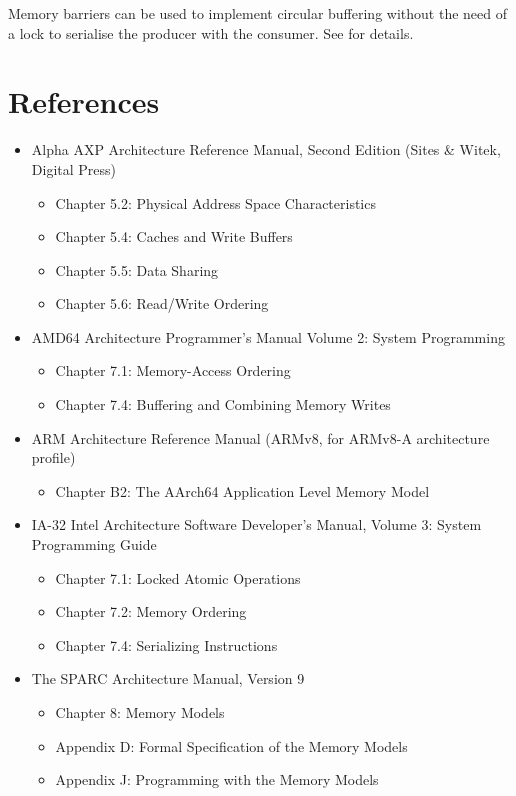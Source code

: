 Memory barriers can be used to implement circular buffering without the need
of a lock to serialise the producer with the consumer.
See  for details.


\section{References}

\begingroup
\footnotesize
\begin{itemize}
\item
Alpha AXP Architecture Reference Manual, Second Edition (Sites \& Witek,
Digital Press)
  \begin{itemize}
    \item
	Chapter 5.2: Physical Address Space Characteristics
    \item
	Chapter 5.4: Caches and Write Buffers
    \item
	Chapter 5.5: Data Sharing
    \item
	Chapter 5.6: Read/Write Ordering
  \end{itemize}

\item
AMD64 Architecture Programmer's Manual Volume 2: System Programming
  \begin{itemize}
    \item
	Chapter 7.1: Memory-Access Ordering
    \item
	Chapter 7.4: Buffering and Combining Memory Writes
  \end{itemize}
       
\item
ARM Architecture Reference Manual (ARMv8, for ARMv8-A architecture profile)
  \begin{itemize}
    \item
	Chapter B2: The AArch64 Application Level Memory Model
  \end{itemize}

\item
IA-32 Intel Architecture Software Developer's Manual, Volume 3:
System Programming Guide
  \begin{itemize}
    \item
	Chapter 7.1: Locked Atomic Operations
    \item
	Chapter 7.2: Memory Ordering
    \item
	Chapter 7.4: Serializing Instructions
  \end{itemize}

\item
The SPARC Architecture Manual, Version 9
  \begin{itemize}
    \item
	Chapter 8: Memory Models
    \item
	Appendix D: Formal Specification of the Memory Models
    \item
	Appendix J: Programming with the Memory Models
  \end{itemize}


\end{itemize}

